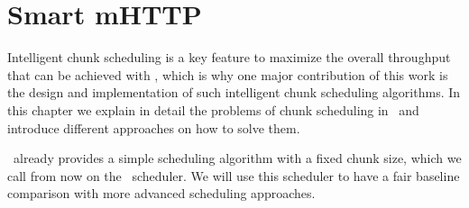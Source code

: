 \chapter{Smart mHTTP}
\label{ch:scheduler}


Intelligent chunk scheduling is a key feature to maximize the overall throughput that can be achieved with \mhttp, which is why 
one major contribution of this work is the design and implementation of such intelligent chunk scheduling algorithms. 
In this chapter we explain in detail the problems of chunk scheduling in \mhttp~and introduce different approaches on how to solve them. 

\protoold~already provides a simple scheduling algorithm with a fixed chunk size, which we call from now on the \algbase~scheduler. 
We will use this scheduler to have a fair baseline comparison with more advanced scheduling approaches. 
